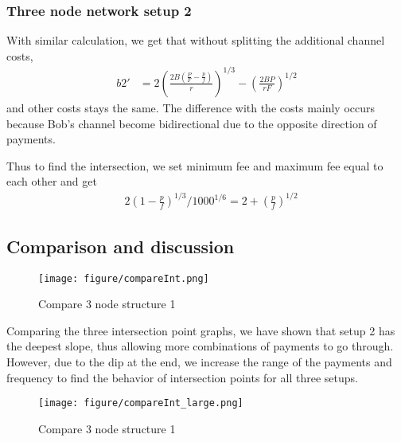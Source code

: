 \documentclass[twocolumn,10pt]{report}
\begin{document}
\subsubsection{Three node network setup 2}

With similar calculation, we get that without splitting the additional channel costs, 
\begin{align}
    b2'& = 2(\frac{2B(\frac{P}{F}-\frac{p}{f})}{r})^{1/3}-(\frac{2BP}{rF})^{1/2} 
\end{align}
and other costs stays the same. The difference with the costs mainly occurs because Bob's channel become bidirectional due to the opposite direction of payments. 

Thus to find the intersection, we set minimum fee and maximum fee equal to each other and get
\begin{align}
    & 2(1-\frac{p}{f})^{1/3}/1000^{1/6} =2+(\frac{p}{f})^{1/2}
\end{align}





\subsection{Comparison and discussion}

\begin{figure}[t]
    \begin{center}
    \setlength{\unitlength}{0.012500in}%
    \texttt{[image: figure/compareInt.png]}
    \end{center}
    \caption{Compare 3 node structure 1}
    \label{figure_4Node1} 
    \end{figure}

Comparing the three intersection point graphs, we have shown that setup 2 has the deepest slope, thus allowing more combinations of payments to go through. However, due to the dip at the end, we increase the range of the payments and frequency to find the behavior of intersection points for all three setups. 

\begin{figure}[t]
    \begin{center}
    \setlength{\unitlength}{0.012500in}%
    \texttt{[image: figure/compareInt\_large.png]}
    \end{center}
    \caption{Compare 3 node structure 1}
    \label{figure_4Node1} 
    \end{figure}
\end{document}
